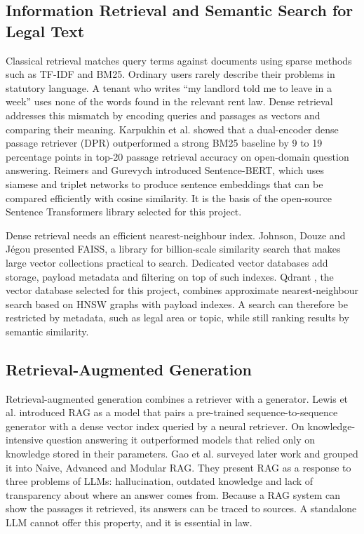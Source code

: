 \subsection{Information Retrieval and Semantic Search for Legal Text}

Classical retrieval matches query terms against documents using sparse methods such as TF-IDF and BM25. Ordinary users rarely describe their problems in statutory language. A tenant who writes ``my landlord told me to leave in a week'' uses none of the words found in the relevant rent law. Dense retrieval addresses this mismatch by encoding queries and passages as vectors and comparing their meaning. Karpukhin et al. \cite{r12} showed that a dual-encoder dense passage retriever (DPR) outperformed a strong BM25 baseline by 9 to 19 percentage points in top-20 passage retrieval accuracy on open-domain question answering. Reimers and Gurevych \cite{r13} introduced Sentence-BERT, which uses siamese and triplet networks to produce sentence embeddings that can be compared efficiently with cosine similarity. It is the basis of the open-source Sentence Transformers library selected for this project.

Dense retrieval needs an efficient nearest-neighbour index. Johnson, Douze and Jégou \cite{r14} presented FAISS, a library for billion-scale similarity search that makes large vector collections practical to search. Dedicated vector databases add storage, payload metadata and filtering on top of such indexes. Qdrant \cite{r20}, the vector database selected for this project, combines approximate nearest-neighbour search based on HNSW graphs with payload indexes. A search can therefore be restricted by metadata, such as legal area or topic, while still ranking results by semantic similarity.

\subsection{Retrieval-Augmented Generation}

Retrieval-augmented generation combines a retriever with a generator. Lewis et al. \cite{r11} introduced RAG as a model that pairs a pre-trained sequence-to-sequence generator with a dense vector index queried by a neural retriever. On knowledge-intensive question answering it outperformed models that relied only on knowledge stored in their parameters. Gao et al. \cite{r15} surveyed later work and grouped it into Naive, Advanced and Modular RAG. They present RAG as a response to three problems of LLMs: hallucination, outdated knowledge and lack of transparency about where an answer comes from. Because a RAG system can show the passages it retrieved, its answers can be traced to sources. A standalone LLM cannot offer this property, and it is essential in law.

